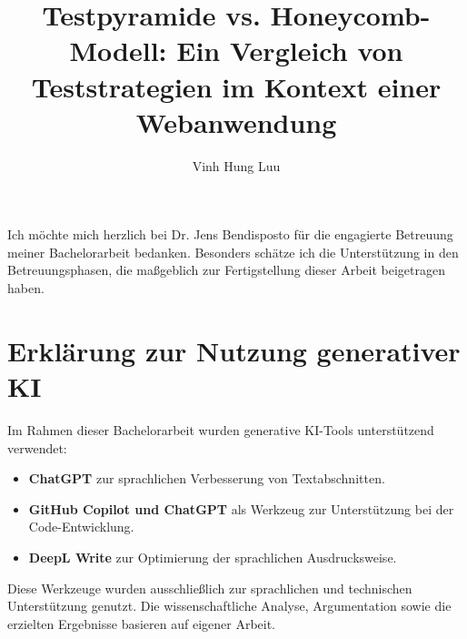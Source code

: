 \documentclass{hhuthesis}
\author{Vinh Hung Luu}
\title{Testpyramide vs. Honeycomb-Modell: Ein Vergleich von Teststrategien im Kontext einer Webanwendung}
\begin{document}
\frontmatter
\makefrontmatter

\begin{acknowledgements}
Ich möchte mich herzlich bei Dr. Jens Bendisposto für die engagierte Betreuung meiner Bachelorarbeit bedanken. Besonders schätze ich die Unterstützung in den Betreuungsphasen, die maßgeblich zur Fertigstellung dieser Arbeit beigetragen haben.
\end{acknowledgements}
\clearpage
\section*{Erklärung zur Nutzung generativer KI}
\thispagestyle{plain} 

Im Rahmen dieser Bachelorarbeit wurden generative KI-Tools unterstützend verwendet:

\begin{itemize}
	\item \textbf{ChatGPT} zur sprachlichen Verbesserung von Textabschnitten.  
	\item \textbf{GitHub Copilot und ChatGPT} als Werkzeug zur Unterstützung bei der Code-Entwicklung.  
	\item \textbf{DeepL Write} zur Optimierung der sprachlichen Ausdrucksweise.  
\end{itemize}

Diese Werkzeuge wurden ausschließlich zur sprachlichen und technischen Unterstützung genutzt. Die wissenschaftliche Analyse, Argumentation sowie die erzielten Ergebnisse basieren auf eigener Arbeit.

\clearpage %
\end{document}
